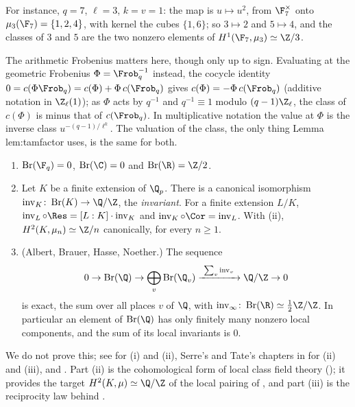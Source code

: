 \begin{example}
For instance, $q=7$, $\ell=3$, $k=v=1$: the map is $u\mapsto u^2$, from $\F_7^\times$ onto $\mu_3(\F_7)=\{1,2,4\}$, with kernel the cubes $\{1,6\}$; so $3\mapsto2$ and $5\mapsto4$,
and the classes of $3$ and $5$ are the two nonzero elements of $H^1(\F_7,\mu_3)\simeq\Z/3$.

The arithmetic Frobenius matters here, though only up to sign. Evaluating at the geometric Frobenius $\Phi=\Frob_q^{-1}$ instead, the cocycle identity
$0=c(\Phi\Frob_q)=c(\Phi)+\Phi\,c(\Frob_q)$ gives $c(\Phi)=-\Phi\,c(\Frob_q)$ (additive notation in $\Z_\ell(1)$); as $\Phi$ acts by $q^{-1}$ and $q^{-1}\equiv1$ modulo $(q-1)\Z_\ell$, the
class of $c(\Phi)$ is minus that of $c(\Frob_q)$. In multiplicative notation the value at $\Phi$ is the inverse class $u^{-(q-1)/\ell^k}$. The valuation of the class, the only
thing Lemma lem:tamfactor uses, is the same for both.
\end{example}

\begin{theorem}\label{thm:galcoh:brauer}
\begin{enumerate}[label=(\roman*)]
\item $\operatorname{Br}(\F_q)=0$, $\operatorname{Br}(\C)=0$ and $\operatorname{Br}(\R)=\Z/2$.
\item Let $K$ be a finite extension of $\Q_p$. There is a canonical isomorphism $\operatorname{inv}_K\colon\operatorname{Br}(K)\to\Q/\Z$, the \emph{invariant}. For a finite
extension $L/K$, $\operatorname{inv}_L\circ\Res=[L:K]\cdot\operatorname{inv}_K$ and $\operatorname{inv}_K\circ\Cor=\operatorname{inv}_L$. With (ii),
$H^2(K,\mu_n)\simeq\Z/n$ canonically, for every $n\ge1$.
\item (Albert, Brauer, Hasse, Noether.) The sequence
\[
0\to\operatorname{Br}(\Q)\to\bigoplus_v\operatorname{Br}(\Q_v)\xrightarrow{\ \sum_v\operatorname{inv}_v\ }\Q/\Z\to0
\]
is exact, the sum over all places $v$ of $\Q$, with $\operatorname{inv}_\infty\colon\operatorname{Br}(\R)\simeq\tfrac12\Z/\Z$. In particular an element of $\operatorname{Br}(\Q)$
has only finitely many nonzero local components, and the sum of its local invariants is $0$.
\end{enumerate}
\end{theorem}

\noindent We do not prove this; see \cite[Chapters X, XII and XIII]{SerreLocalFields} for (i) and (ii), Serre's and Tate's chapters in
\cite[Chapters VI and VII]{CasselsFrohlich} for (ii) and (iii), and \cite[Chapter II, Section 5]{SerreGaloisCoh}. Part (ii) is the cohomological form of local class
field theory (); it provides the target $H^2(K,\mu)\simeq\Q/\Z$ of the local pairing of , and part (iii) is the reciprocity law behind
.

